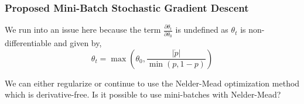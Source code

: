 \documentclass[aspectratio=169]{beamer}\usepackage[utf8]{inputenc}
\begin{document}
\begin{frame}\frametitle{Proposed Mini-Batch Stochastic Gradient Descent}
We run into an issue here because the term $ \frac{\partial \theta_t }{\partial \theta_0} $ is undefined as $\theta_t$ is non-differentiable and given by,
\begin{equation*}
  \theta_t = \max \left( \theta_0 , \frac{ |\dot{p}| }{ \min (p, 1-p)} \right)
\end{equation*}

We can either regularize or continue to use the Nelder-Mead optimization method which is derivative-free. Is it possible to use mini-batches with Nelder-Mead?

\end{frame}





\end{document}
